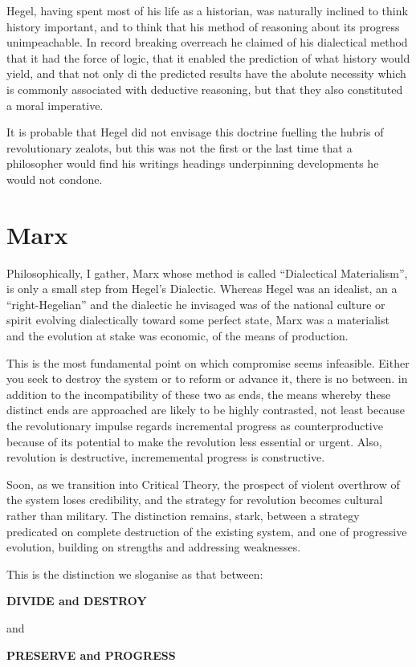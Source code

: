 \documentclass[10pt,titlepage]{book}
\begin{document}
Hegel, having spent most of his life as a historian, was naturally inclined to think history important, and to think that his method of reasoning about its progress unimpeachable.
In record breaking overreach he claimed of his dialectical method that it had the force of logic, that it enabled the prediction of what history would yield, and that not only di the predicted results have the abolute necessity which is commonly associated with deductive reasoning, but that they also constituted a moral imperative.

It is probable that Hegel did not envisage this doctrine fuelling the hubris of revolutionary zealots, but this was not the first or the last time that a philosopher would find his writings headings underpinning developments he would not condone.


\section{Marx}

Philosophically, I gather, Marx whose method is called ``Dialectical Materialism'', is only a small step from Hegel's Dialectic.
Whereas Hegel was an idealist, an a ``right-Hegelian'' and the dialectic he invisaged was of the national culture or spirit evolving dialectically toward some perfect state, Marx was a materialist and the evolution at stake was economic, of the means of production.

This is the most fundamental point on which compromise seems infeasible.
Either you seek to destroy the system or to reform or advance it, there is no between.
in addition to the incompatibility of these two as ends, the means whereby these distinct ends are approached are likely to be highly contrasted, not least because the revolutionary impulse regards incremental progress as counterproductive because of its potential to make the revolution less essential or urgent.
Also, revolution is destructive, incrememental progress is constructive.

Soon, as we transition into Critical Theory, the prospect of violent overthrow of the system loses credibility, and the strategy for revolution becomes cultural rather than military.
The distinction remains, stark, between a strategy predicated on complete destruction of the existing system, and one of progressive evolution, building on strengths and addressing weaknesses.

This is the distinction we sloganise as that between:

\begin{minipage}[t]{0.8\linewidth}

\begin{centering}
\vspace{0.1in}
       {\bf DIVIDE and DESTROY}
       
\vspace{0.1in}
and

\vspace{0.1in}
       {\bf PRESERVE and PROGRESS}
       
\vspace{0.1in}
\        
\end{centering}
\end{minipage}
\end{document}
